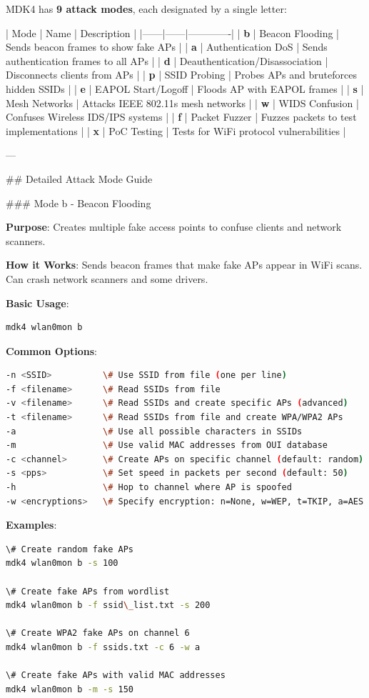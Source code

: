 \documentclass[11pt,a4paper]{article}
\begin{document}
MDK4 has \textbf{9 attack modes}, each designated by a single letter:

| Mode | Name | Description |
|------|------|-------------|
| \textbf{b} | Beacon Flooding | Sends beacon frames to show fake APs |
| \textbf{a} | Authentication DoS | Sends authentication frames to all APs |
| \textbf{d} | Deauthentication/Disassociation | Disconnects clients from APs |
| \textbf{p} | SSID Probing | Probes APs and bruteforces hidden SSIDs |
| \textbf{e} | EAPOL Start/Logoff | Floods AP with EAPOL frames |
| \textbf{s} | Mesh Networks | Attacks IEEE 802.11s mesh networks |
| \textbf{w} | WIDS Confusion | Confuses Wireless IDS/IPS systems |
| \textbf{f} | Packet Fuzzer | Fuzzes packets to test implementations |
| \textbf{x} | PoC Testing | Tests for WiFi protocol vulnerabilities |

---

\#\# Detailed Attack Mode Guide

\#\#\# Mode b - Beacon Flooding

\textbf{Purpose}: Creates multiple fake access points to confuse clients and network scanners.

\textbf{How it Works}: Sends beacon frames that make fake APs appear in WiFi scans. Can crash network scanners and some drivers.

\textbf{Basic Usage}:
\begin{lstlisting}[language=bash]
mdk4 wlan0mon b
\end{lstlisting}

\textbf{Common Options}:
\begin{lstlisting}[language=bash]
-n <SSID>          \# Use SSID from file (one per line)
-f <filename>      \# Read SSIDs from file
-v <filename>      \# Read SSIDs and create specific APs (advanced)
-t <filename>      \# Read SSIDs from file and create WPA/WPA2 APs
-a                 \# Use all possible characters in SSIDs
-m                 \# Use valid MAC addresses from OUI database
-c <channel>       \# Create APs on specific channel (default: random)
-s <pps>           \# Set speed in packets per second (default: 50)
-h                 \# Hop to channel where AP is spoofed
-w <encryptions>   \# Specify encryption: n=None, w=WEP, t=TKIP, a=AES
\end{lstlisting}

\textbf{Examples}:
\begin{lstlisting}[language=bash]
\# Create random fake APs
mdk4 wlan0mon b -s 100

\# Create fake APs from wordlist
mdk4 wlan0mon b -f ssid\_list.txt -s 200

\# Create WPA2 fake APs on channel 6
mdk4 wlan0mon b -f ssids.txt -c 6 -w a

\# Create fake APs with valid MAC addresses
mdk4 wlan0mon b -m -s 150
\end{lstlisting}
\end{document}
